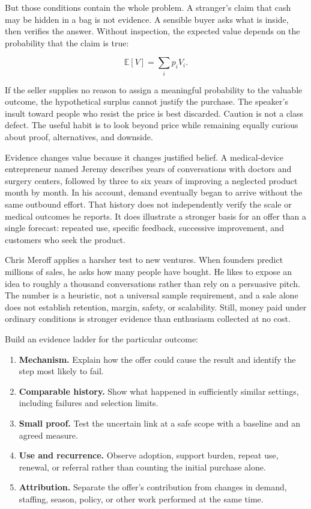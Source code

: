 But those conditions contain the whole problem. A stranger's claim that cash
may be hidden in a bag is not evidence. A sensible buyer asks what is inside,
then verifies the answer. Without inspection, the expected value depends on
the probability that the claim is true:

\begin{equation}
\mathbb{E}[V]=\sum_i p_i V_i.
\end{equation}

If the seller supplies no reason to assign a meaningful probability to the
valuable outcome, the hypothetical surplus cannot justify the purchase. The
speaker's insult toward people who resist the price is best discarded. Caution
is not a class defect. The useful habit is to look beyond price while remaining
equally curious about proof, alternatives, and downside.

Evidence changes value because it changes justified belief. A medical-device
entrepreneur named Jeremy describes years of conversations with doctors and
surgery centers, followed by three to six years of improving a neglected
product month by month. In his account, demand eventually began to arrive
without the same outbound effort. That history does not independently verify
the scale or medical outcomes he reports. It does illustrate a stronger basis
for an offer than a single forecast: repeated use, specific feedback,
successive improvement, and customers who seek the product.

Chris Meroff applies a harsher test to new ventures. When founders predict
millions of sales, he asks how many people have bought. He likes to expose an
idea to roughly a thousand conversations rather than rely on a persuasive
pitch. The number is a heuristic, not a universal sample requirement, and a
sale alone does not establish retention, margin, safety, or scalability. Still,
money paid under ordinary conditions is stronger evidence than enthusiasm
collected at no cost.

Build an evidence ladder for the particular outcome:

\begin{enumerate}[itemsep=0.15em]
\item \textbf{Mechanism.} Explain how the offer could cause the result and
  identify the step most likely to fail.
\item \textbf{Comparable history.} Show what happened in sufficiently similar
  settings, including failures and selection limits.
\item \textbf{Small proof.} Test the uncertain link at a safe scope with a
  baseline and an agreed measure.
\item \textbf{Use and recurrence.} Observe adoption, support burden, repeat
  use, renewal, or referral rather than counting the initial purchase alone.
\item \textbf{Attribution.} Separate the offer's contribution from changes in
  demand, staffing, season, policy, or other work performed at the same time.
\end{enumerate}

